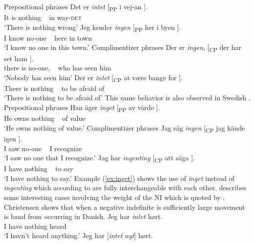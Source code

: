 \documentclass[12pt, letterpaper]{article}
\begin{document}
	\ea Prepositional phrases
		\ea 
		\gll Det er \textit{intet} [\textsubscript{PP} i vej-an ].\\
			It is nothing ~ in way-\textsc{det}\\
		\glt `There is nothing wrong'
		\ex 
		\gll Jeg kender \textit{ingen} [\textsubscript{PP} her i byen ].\\
			I know no-one ~ here in town\\
		\glt `I know no one in this town.'
		\z
	\ex Complimentizer phrases
		\ea 
		\gll Der er \textit{ingen}, [\textsubscript{CP} der har set ham ].\\
		there is no-one, ~ who has seen him\\
		\glt `Nobody has seen him'
		\ex
		\gll Der er \textit{intet} [\textsubscript{CP} at være bange for ].\\
		There is nothing ~ to be afraid of\\
		\glt `There is nothing to be afraid of'
		\z 
	\z
\ex This same behavior is also observed in Swedish \citep[197ff]{holmesSwedishComprehensiveGrammar2013}.
	\ea Prepositional phrases
		\ea \label{ex:inget}
		\gll Han äger \textit{inget} [\textsubscript{PP} av värde ].\\
			He owns nothing ~ of value\\
		\glt `He owns nothing of value.'
		\z 
	\ex Complimentizer phrases
		\ea
		\gll Jag såg \textit{ingen} [\textsubscript{CP} jag {kände igen} ].\\
		I saw no-one ~ I recognize\\
		\glt `I saw no one that I recognize.'
		\ex 
		\gll Jag har \textit{ingenting} [\textsubscript{CP} att säga ].\\
		I have nothing ~ to say\\
		\glt `I have nothing to say.'
		\z 
	\z
\ex Example (\ref{ex:inget}) shows the use of \textit{inget} instead of \textit{ingenting} which according to \citet{holmesSwedishComprehensiveGrammar2013} are fully interchangeable with each other.
\ex \citet[65f]{christensenInterfacesNegationSyntax2005} describes some interesting cases involving the weight of the NI which is quoted by \citet{penkaNegativeIndefinites2011}.
\ex Christensen shows that when a negative indefinite is sufficiently large movement is band from occurring in Danish.
	\ea
	\gll Jeg har \textit{intet} hørt.\\
	I have nothing heard\\
	\glt  `I havn't heard anything.'
	\ex 
	\gll Jeg har [\textit{intet} \textit{nyt}] hørt.\\
\end{document}
